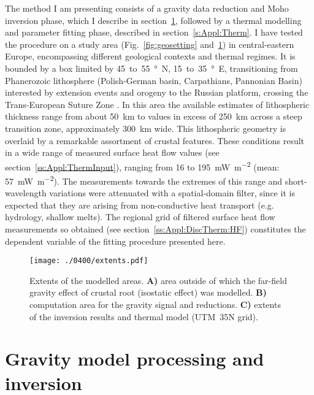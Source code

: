 The method I am presenting consists of a gravity data reduction and Moho inversion phase, which I describe in section~\ref{s:Appl:Grav}, followed by a thermal modelling and parameter fitting phase, described in section~\ref{s:Appl:Therm}.
I have tested the procedure on a study area (Fig.~\ref{fig:geosetting} and~\ref{fig:extents}) in central-eastern Europe, encompassing different geological contexts and thermal regimes.
It is bounded by a box limited by \num{45}~to~\SI{55}{\degree N}, \num{15}~to~\SI{35}{\degree E}, transitioning from Phanerozoic lithosphere (Polish-German basin, Carpathians, Pannonian Basin) interested by extension events and orogeny to the Russian platform, crossing the Trans-European Suture Zone \parencite[TESZ,][]{Jones2010}.
In this area the available estimates of lithospheric thickness range from about 50~\si{\kilo \metre} to values in excess of 250~\si{\kilo \metre} across a steep transition zone, approximately 300~\si{\kilo \metre} wide.
This lithospheric geometry is overlaid by a remarkable assortment of crustal features.
These conditions result in a wide range of measured surface heat flow values (see section~\ref{ss:Appl:ThermInput}), ranging from 16 to 195~\si{\milli \watt \per \square \metre} (mean: 57~\si{\milli \watt \per \square \metre}).
The measurements towards the extremes of this range and short-wavelength variations were attenuated with a spatial-domain filter, since it is expected that they are arising from non-conductive heat transport (e.g. hydrology, shallow melts).
The regional grid of filtered surface heat flow measurements so obtained (see section~\ref{ss:Appl:DiscTherm:HF}) constitutes the dependent variable of the fitting procedure presented here.
\begin{figure}[hb]
    \begin{adjustbox}{center}
    \texttt{[image: ./0400/extents.pdf]}
    \end{adjustbox}
    \caption[Gravity modelling: extents of the modelled areas.]{Extents of the modelled areas. \textbf{A)} area outside of which the far-field gravity effect of crustal root (isostatic effect) was modelled. \textbf{B)} computation area for the gravity signal and reductions. \textbf{C)} extents of the inversion results and thermal model (UTM~35N grid).}
	\label{fig:extents}
\end{figure}

\FloatBarrier
\section{Gravity model processing and inversion}
\label{s:Appl:Grav}

